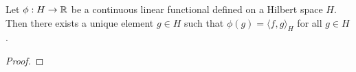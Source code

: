\begin{theorem}
    \cite{small1994hilbert} %
    Let \(\phi : H \to \mathbb{R}\) be a continuous linear functional defined on a Hilbert space \(H\).
    Then there exists a unique element \(g \in H\) such that \(\phi(g) = \langle f, g \rangle_H\) for all \(g \in H\).
\end{theorem}

\begin{proof}
    
\end{proof}

